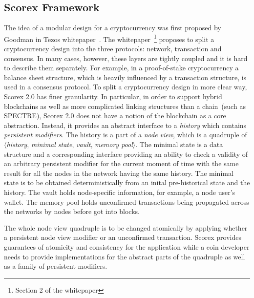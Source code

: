 
\subsection{Scorex Framework}

The idea of a modular design for a cryptocurrency was first proposed by Goodman in Tezos whitepaper~\cite{goodmantezos}. The whitepaper~\footnote{Section 2 of the whitepaper} proposes to split a cryptocurrency design into the three protocols: network, transaction and consensus. In many cases, however, these layers are tightly coupled and it is hard to describe them separately. For example, in a proof-of-stake cryptocurrency a balance sheet structure, which is heavily influenced by a transaction structure, is used in a consensus protocol. To split a cryptocurrency design in more clear way, Scorex 2.0 has finer granularity. In particular, in order to support hybrid blockchains as well as more complicated linking structures than a chain~(such as SPECTRE\cite{EPRINT:SomLewZoh16}), Scorex 2.0 does not have a notion of the blockchain as a core abstraction. Instead, it provides an abstract interface to a \textit{history} which contains \textit{persistent modifiers}. The history is a part of a \textit{node view}, which is a quadruple of $\langle$\textit{history}, \textit{minimal state}, \textit{vault}, \textit{memory pool}$\rangle$. The minimal state is a data structure and a corresponding interface providing an ability to check a validity of an arbitrary persistent modifier for the current moment of time with the same result for all the nodes in the network having the same history. The minimal state is to be obtained deterministically from an inital pre-historical state and the history. The vault holds node-specific information, for example, a node user's wallet. The memory pool holds unconfirmed transactions being propagated across the networks by nodes before got into blocks. 

The whole node view quadruple is to be changed atomically by applying whether a persistent node view modifier or an unconfirmed transaction. Scorex provides guarantees of atomicity and consistency for the application while a coin developer needs to provide implementations for the abstract parts of the quadruple as well as a family of persistent modifiers.